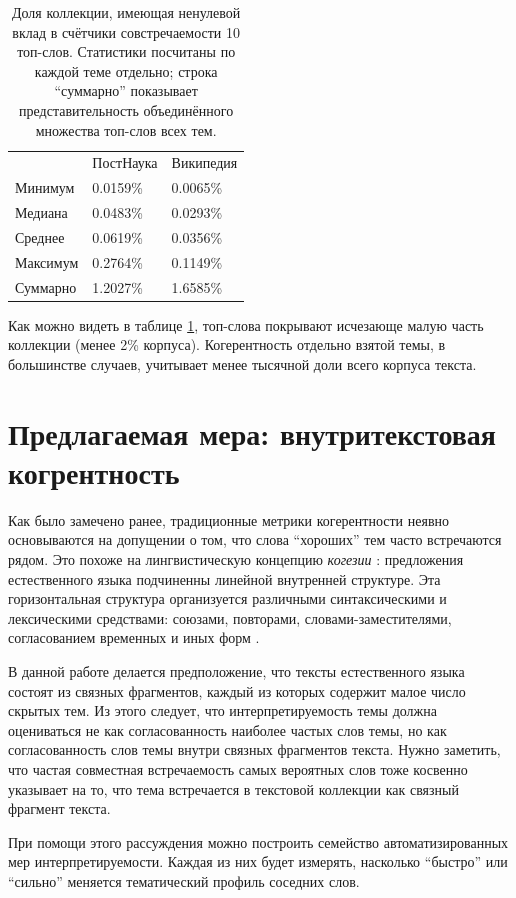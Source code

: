 \begin{table}[ht]
\begin{tabular}{lll}
         & ПостНаука & Википедия \\
Минимум  & 0.0159\%  & 0.0065\%  \\
Медиана  & 0.0483\%  & 0.0293\%  \\
Среднее  & 0.0619\%  & 0.0356\%  \\
Максимум & 0.2764\%  & 0.1149\%  \\
Суммарно & 1.2027\%  & 1.6585\% 
\end{tabular}
    \caption{
      Доля коллекции, имеющая ненулевой вклад в счётчики совстречаемости 10 топ-слов. Статистики посчитаны по каждой теме отдельно; строка ``суммарно'' показывает представительность объединённого множества топ-слов всех тем.
    }
    \label{table:represented}
\end{table}

Как можно видеть в таблице \ref{table:represented}, топ-слова покрывают исчезающе малую часть коллекции (менее 2\% корпуса). Когерентность отдельно взятой темы, в большинстве случаев, учитывает менее тысячной доли всего корпуса текста.


\section{Предлагаемая мера: внутритекстовая когрентность}

Как было замечено ранее, традиционные метрики когерентности неявно основываются на допущении о том, что слова ``хороших'' тем часто встречаются рядом. Это похоже на лингвистическую концепцию \textit{когезии} \cite{halliday1976cohesion}: предложения естественного языка подчиненны линейной внутренней структуре. Эта горизонтальная структура организуется 
различными синтаксическими и лексическими средствами: союзами, повторами, словами-заместителями, согласованием временных и иных форм \cite{kazachenko2009}.

В данной работе делается предположение, что тексты естественного языка состоят из связных фрагментов, каждый из которых содержит малое число скрытых тем. Из этого следует, что интерпретируемость темы должна оцениваться не как согласованность наиболее частых слов темы, но как согласованность слов темы внутри связных фрагментов текста. Нужно заметить, что частая совместная встречаемость самых вероятных слов тоже косвенно указывает на то, что тема встречается в текстовой коллекции как связный фрагмент текста.

При помощи этого рассуждения можно построить семейство автоматизированных мер интерпретируемости. Каждая из них будет измерять, насколько ``быстро'' или ``сильно'' меняется тематический профиль соседних слов. 

